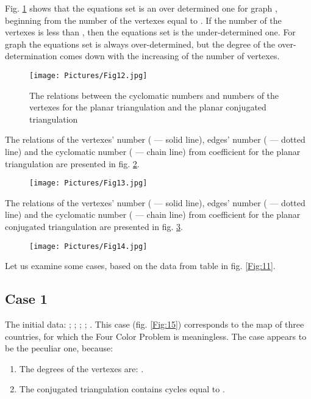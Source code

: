\documentclass{amsart}
\theoremstyle{plain}
\numberwithin{equation}{section}
\begin{document}
Fig. \ref {Fig:12} shows that the equations set is an over determined one for graph , beginning from the number of the vertexes equal to . If the number of the vertexes is less than , then the equations set is the under-determined one. For graph  the equations set is always over-determined, but the degree of the over-determination comes down with the increasing of the number of vertexes.

\begin{figure}[htb]
		\texttt{[image: Pictures/Fig12.jpg]}
	\caption{The relations between the cyclomatic numbers and numbers of the vertexes for the planar triangulation and the planar conjugated triangulation}
	\label{Fig:12}
\end{figure}

The relations of the vertexes' number ( --- solid line), edges' number ( --- dotted line) and the cyclomatic number ( --- chain line) from coefficient  for the planar triangulation are presented in fig. \ref{Fig:13}. 

\begin{figure}[htb]
	\texttt{[image: Pictures/Fig13.jpg]}
	\caption{}
	\label{Fig:13}
\end{figure}

The relations of the vertexes' number ( --- solid line), edges' number ( --- dotted line) and the cyclomatic number ( --- chain line) from coefficient  for the planar conjugated triangulation are presented in fig. \ref {Fig:14}.

\begin{figure}[htb]
		\texttt{[image: Pictures/Fig14.jpg]}
	\caption{}
	\label{Fig:14}
\end{figure}

Let us examine some cases, based on the data from table in fig. \ref {Fig:11}.

\subsection {Case 1}

The initial data: ; ; ; ; . 
This case (fig. \ref{Fig:15}) corresponds to the map of three countries, for which the Four Color Problem is meaningless. The case appears to be the peculiar one, because:

\begin{enumerate}
\item	
The degrees of the vertexes are: .
\item	
The conjugated triangulation contains cycles equal to .
\end {enumerate}
\end{document}
